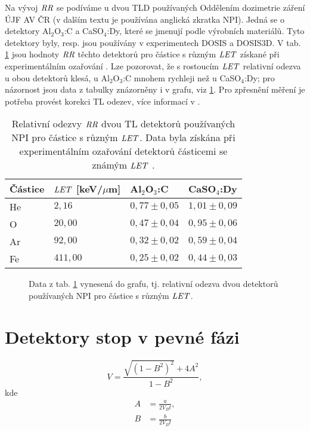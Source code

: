 Na vývoj $\mathit{RR}$ se podíváme u dvou TLD používaných Oddělením dozimetrie záření ÚJF AV ČR (v dalším textu je používána anglická zkratka NPI). Jedná se o detektory Al$_2$O$_3$:C a CaSO$_4$:Dy, které se jmenují podle výrobních materiálů. Tyto detektory byly, resp. jsou používány v experimentech DOSIS a DOSIS3D. V tab. \ref{tab:detektory_TLD_RR} jsou hodnoty $\mathit{RR}$ těchto detektorů pro částice s různým $\mathit{LET}$ získané při experimentálním ozařování \cite{TLD_RR}. Lze pozorovat, že s rostoucím $\mathit{LET}$ relativní odezva u obou detektorů klesá, u Al$_2$O$_3$:C mnohem rychleji než u CaSO$_4$:Dy; pro názornost jsou data z tabulky znázorněny i v grafu, viz \ref{fig:detektory_TLD_RR}. Pro zpřesnění měření je potřeba provést korekci TL odezev, více informací v
\cite{TLD_RR}.
\begin{table}[h]
  \centering
  \begin{tabular}{llll}
	\toprule
	Částice&$\mathit{LET}$ [keV/$\mu$m]&Al$_2$O$_3$:C & CaSO$_4$:Dy\\
	\midrule
	He&$2,16$ &$0,77 \pm0,05$&$1,01\pm 0,09$\\
	O &$20,00$ &$0,47 \pm0,04$&$0,95\pm 0,06$\\
	Ar&$92,00$ &$0,32 \pm0,02$&$0,59\pm 0,04$\\
	Fe&$411,00 $ &$0,25 \pm0,02$&$0,44\pm 0,03$\\
\bottomrule
  \end{tabular}
  \caption{Relativní odezvy $\mathit{RR}$ dvou TL detektorů používaných NPI pro částice s různým $\mathit{LET}$. Data byla získána při experimentálním ozařování detektorů částicemi se známým $\mathit{LET}$ \cite{TLD_RR}.}
  \label{tab:detektory_TLD_RR}
\end{table}
\begin{figure}[h]
  \centering
  
  \caption{Data z tab. \ref{tab:detektory_TLD_RR} vynesená do grafu, tj. relativní odezva dvou detektorů používaných NPI pro částice s různým $\mathit{LET}$.}
  \label{fig:detektory_TLD_RR}
\end{figure}
\section{Detektory stop v pevné fázi}

\begin{equation}
  V=\frac{\sqrt{\left( 1-B^2 \right)^2}+4A^2}{1-B^2},
  \label{eq:pomerLepRychlosti}
\end{equation}
kde
\begin{align*}
  A&=\frac{a}{2V_Bt},\\
  B&=\frac{b}{2V_Bt}
\end{align*}

